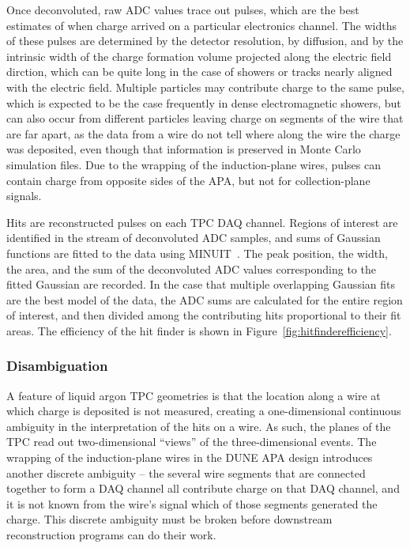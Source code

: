 Once deconvoluted, raw ADC values trace out pulses, which are the best
estimates of when charge arrived on a particular electronics channel.
The widths of these pulses are determined by the detector resolution,
by diffusion, and by the intrinsic width of the charge formation
volume projected along the electric field dirction, which can be quite
long in the case of showers or tracks nearly aligned with the electric
field.  Multiple particles may contribute charge to the same pulse,
which is expected to be the case frequently in dense electromagnetic
showers, but can also occur from different particles leaving charge on
segments of the wire that are far apart, as the data from a wire do
not tell where along the wire the charge was deposited, even though
that information is preserved in Monte Carlo simulation files.  Due to
the wrapping of the induction-plane wires, pulses can contain charge
from opposite sides of the APA, but not for collection-plane signals.

Hits are reconstructed pulses on each TPC DAQ channel.  Regions of
interest are identified in the stream of deconvoluted ADC samples, and
sums of Gaussian functions are fitted to the data using
MINUIT~\cite{minuit}.  The peak position, the width, the area, and the
sum of the deconvoluted ADC values corresponding to the fitted
Gaussian are recorded.  In the case that multiple overlapping Gaussian
fits are the best model of the data, the ADC sums are calculated for
the entire region of interest, and then divided among the contributing
hits proportional to their fit areas.  The efficiency of the hit
finder is shown in Figure~\ref{fig:hitfinderefficiency}.

\subsubsection{Disambiguation}

A feature of liquid argon TPC geometries is that the location along a
wire at which charge is deposited is not measured, creating a
one-dimensional continuous ambiguity in the interpretation of the hits
on a wire.  As such, the planes of the TPC read out two-dimensional
``views'' of the three-dimensional events.  The wrapping of the
induction-plane wires in the DUNE APA design introduces another
discrete ambiguity -- the several wire segments that are connected
together to form a DAQ channel all contribute charge on that DAQ
channel, and it is not known from the wire's signal which of those
segments generated the charge.  This discrete ambiguity must be broken
before downstream reconstruction programs can do their work.

